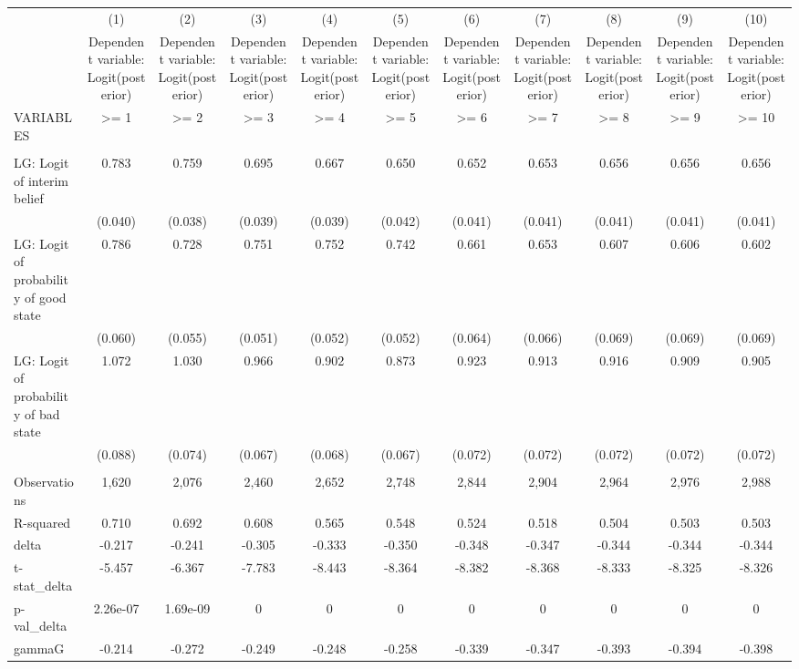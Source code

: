 \documentclass[]{article}
\begin{document}
\begin{tabular}{lcccccccccc} \hline
 & (1) & (2) & (3) & (4) & (5) & (6) & (7) & (8) & (9) & (10) \\
 & Dependent variable: Logit(posterior) & Dependent variable: Logit(posterior) & Dependent variable: Logit(posterior) & Dependent variable: Logit(posterior) & Dependent variable: Logit(posterior) & Dependent variable: Logit(posterior) & Dependent variable: Logit(posterior) & Dependent variable: Logit(posterior) & Dependent variable: Logit(posterior) & Dependent variable: Logit(posterior) \\
VARIABLES & >= 1 & >= 2 & >= 3 & >= 4 & >= 5 & >= 6 & >= 7 & >= 8 & >= 9 & >= 10 \\ \hline
 &  &  &  &  &  &  &  &  &  &  \\
LG: Logit of interim belief & 0.783 & 0.759 & 0.695 & 0.667 & 0.650 & 0.652 & 0.653 & 0.656 & 0.656 & 0.656 \\
 & (0.040) & (0.038) & (0.039) & (0.039) & (0.042) & (0.041) & (0.041) & (0.041) & (0.041) & (0.041) \\
LG: Logit of probability of good state & 0.786 & 0.728 & 0.751 & 0.752 & 0.742 & 0.661 & 0.653 & 0.607 & 0.606 & 0.602 \\
 & (0.060) & (0.055) & (0.051) & (0.052) & (0.052) & (0.064) & (0.066) & (0.069) & (0.069) & (0.069) \\
LG: Logit of probability of bad state & 1.072 & 1.030 & 0.966 & 0.902 & 0.873 & 0.923 & 0.913 & 0.916 & 0.909 & 0.905 \\
 & (0.088) & (0.074) & (0.067) & (0.068) & (0.067) & (0.072) & (0.072) & (0.072) & (0.072) & (0.072) \\
 &  &  &  &  &  &  &  &  &  &  \\
Observations & 1,620 & 2,076 & 2,460 & 2,652 & 2,748 & 2,844 & 2,904 & 2,964 & 2,976 & 2,988 \\
R-squared & 0.710 & 0.692 & 0.608 & 0.565 & 0.548 & 0.524 & 0.518 & 0.504 & 0.503 & 0.503 \\
delta & -0.217 & -0.241 & -0.305 & -0.333 & -0.350 & -0.348 & -0.347 & -0.344 & -0.344 & -0.344 \\
t-stat\_delta & -5.457 & -6.367 & -7.783 & -8.443 & -8.364 & -8.382 & -8.368 & -8.333 & -8.325 & -8.326 \\
p-val\_delta & 2.26e-07 & 1.69e-09 & 0 & 0 & 0 & 0 & 0 & 0 & 0 & 0 \\
gammaG & -0.214 & -0.272 & -0.249 & -0.248 & -0.258 & -0.339 & -0.347 & -0.393 & -0.394 & -0.398 \\

\end{tabular}
\end{document}
